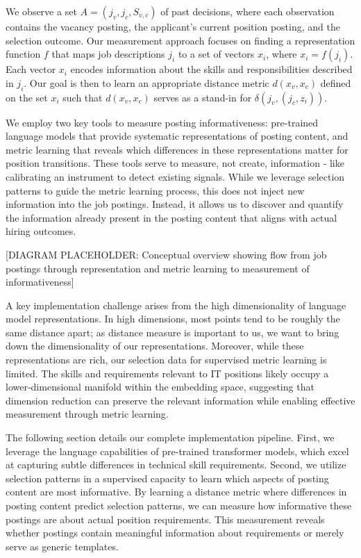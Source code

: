 We observe a set $A = {(j_v, j_c, S_{v,c})}$ of past decisions, where each observation contains the vacancy 
posting, the applicant's current position posting, and the selection outcome. Our measurement approach 
focuses on finding a representation function $f$ that maps job descriptions ${j_i}$ to a set of 
vectors ${x_i}$, where $x_i = f(j_i)$. Each vector $x_i$ encodes information about the skills and 
responsibilities described in $j_i$. Our goal is then to learn an appropriate distance metric $d(x_v, x_c)$ 
defined on the set ${x_i}$ such that $d(x_v, x_c)$ serves as a stand-in for $\delta(j_v, (j_c, z_i))$.


We employ two key tools to measure posting informativeness: pre-trained language models that provide 
systematic representations of posting content, and metric learning that reveals which differences in 
these representations matter for position transitions. These tools serve to measure, not create, 
information - like calibrating an instrument to detect existing signals. While we leverage selection 
patterns to guide the metric learning process, this does not inject new information into the job postings. 
Instead, it allows us to discover and quantify the information already present in the posting content that 
aligns with actual hiring outcomes.

[DIAGRAM PLACEHOLDER: Conceptual overview showing flow from job postings through representation and metric learning to measurement of informativeness]

A key implementation challenge arises from the high dimensionality of language model representations. 
In high dimensions, most points tend to be roughly the same distance apart; as distance measure is 
important to us, we want to bring down the dimensionality of our representations. Moreover, while 
these representations are rich, our selection data for supervised metric learning is limited. The 
skills and requirements relevant to IT positions likely occupy a lower-dimensional manifold within 
the embedding space, suggesting that dimension reduction can preserve the relevant information while 
enabling effective measurement through metric learning.

The following section details our complete implementation pipeline. First, we leverage the language capabilities 
of pre-trained transformer models, which excel at capturing subtle differences in technical skill requirements. 
Second, we utilize selection patterns in a supervised capacity to learn which aspects of posting content are most 
informative. By learning a distance metric where differences in posting content predict selection patterns, we 
can measure how informative these postings are about actual position requirements. This measurement reveals 
whether postings contain meaningful information about requirements or merely serve as generic templates.